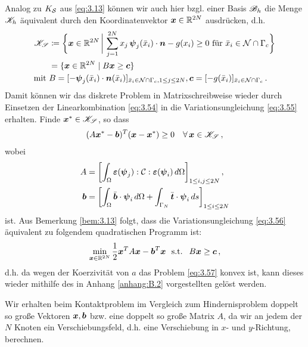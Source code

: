 Analog zu $K_{\mathcal S}$ aus \eqref{eq:3.13} können wir auch hier bzgl. einer Basis $\mathscr B_h$ die Menge $\mathscr K_h$ äquivalent durch den Koordinatenvektor $\boldsymbol x \in \mathbb{R}^{2N}$ ausdrücken, d.h.
\begin{align*}
	\mathscr K_{\mathscr S}  &\coloneqq \bigg\{ \boldsymbol x \in \mathbb{R}^{2N} \,\bigg| \, \sum_{j=1}^{2N} x_j \, \boldsymbol \psi_j(\bar x_i) \cdot \boldsymbol n- g(x_i) \ge 0 \text{ für } \bar x_i \in \mathcal N \cap \Gamma_c\bigg\} \\
	& = \{ \boldsymbol x \in \mathbb{R}^{2N} \mid B\boldsymbol x \ge \boldsymbol c\} \\
	\text{mit } & B =  [-\boldsymbol \psi_j(\bar x_i)\cdot \boldsymbol n(\bar x_i)]_{\bar x_i \in \mathcal N \cap \Gamma_c, 1\le j \le 2N} ,\boldsymbol c = [-g(\bar x_i)]_{\bar x_i \in\mathcal N \cap \Gamma_c} \, .
\end{align*}
Damit können wir das diskrete Problem in Matrixschreibweise wieder durch Einsetzen der Linearkombination \eqref{eq:3.54} in die Variationsungleichung \eqref{eq:3.55} erhalten. Finde $\boldsymbol x^* \in \mathscr K_{\mathscr S}$, so dass
\begin{align}\label{eq:3.56}
	(A\boldsymbol x^* - \boldsymbol b)^T (\boldsymbol x - \boldsymbol x^*) \ge 0 \quad \forall \, \boldsymbol x\in \mathscr K_{\mathscr S} \, ,
\end{align}
wobei
\begin{align*}
	A &= \left[\int_\Omega \boldsymbol {\varepsilon} (\boldsymbol \psi_j):\mathcal C:\boldsymbol {\varepsilon}(\boldsymbol \psi_i) \, d\Omega\right]_{1 \le i,j\le 2N} , \\
	 \boldsymbol b& = \left[ \int_\Omega \bar{\boldsymbol b} \cdot \boldsymbol\psi_i \, d\Omega + \int_{\Gamma_N} \bar{\boldsymbol 	t} \cdot \boldsymbol\psi_i \, ds\right]_{1\le i \le 2N}
\end{align*}
ist. Aus Bemerkung \ref{bem:3.13} folgt, dass die Variationsungleichung \eqref{eq:3.56} äquivalent zu folgendem quadratischen Programm ist:
\begin{align}\label{eq:3.57}
\min_{\bs x\in \R^{2N}} \frac 1 2 \bs x^T A \bs x - \bs b^T \bs x \ \text{ s.t. } \ B\bs x \ge \bs c \, ,
\end{align}
d.h. da wegen der Koerzivität von $a$ das Problem \eqref{eq:3.57} konvex ist, kann dieses wieder mithilfe des in Anhang \ref{anhang:B.2} vorgestellten  gelöst werden.

\begin{bem}\label{bem:3.25}
Wir erhalten beim Kontaktproblem im Vergleich zum Hindernisproblem  doppelt so große Vektoren $\boldsymbol x, \boldsymbol b$ bzw. eine doppelt so große Matrix $A$, da wir an jedem der $N$ Knoten ein Verschiebungsfeld, d.h. eine Verschiebung in $x$- und $y$-Richtung, berechnen.
\end{bem}





\newpage

